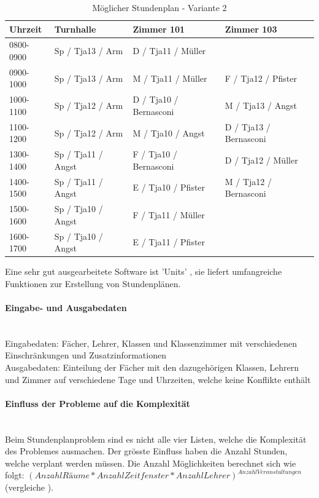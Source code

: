 \begin{table}[ht]
\centering
  \begin{tabular}{ l | l | l | l }
	\hline
	\rowcolor{gray}
	\textbf{Uhrzeit} 	& \textbf{Turnhalle}	& \textbf{Zimmer 101} 	& \textbf{Zimmer 103}	\\ \hline
	0800-0900		& Sp / Tja13 / Arm		& D / Tja11 / Müller		& 				\\ \hline
	0900-1000		& Sp / Tja13 / Arm		& M / Tja11 / Müller		& F / Tja12 / Pfister		\\ \hline
	1000-1100		& Sp / Tja12 / Arm		& D / Tja10 / Bernasconi	& M / Tja13 / Angst		\\ \hline
	1100-1200		& Sp / Tja12 / Arm		& M / Tja10 / Angst		& D / Tja13 / Bernasconi	\\ \hline \hline
	1300-1400		& Sp / Tja11 / Angst	& F / Tja10 / Bernasconi	& D / Tja12 / Müller		\\ \hline
	1400-1500		& Sp / Tja11 / Angst	& E / Tja10 / Pfister		& M / Tja12 / Bernasconi	\\ \hline
	1500-1600		& Sp / Tja10 / Angst	& F / Tja11 / Müller		& 				\\ \hline
	1600-1700		& Sp / Tja10 / Angst	& E / Tja11 / Pfister		& 				\\ \hline
  \end{tabular}
   \caption{Möglicher Stundenplan - Variante 2}\label{table:timetable_2}
\end{table}

\FloatBarrier
	Eine sehr gut ausgearbeitete Software ist 'Units' \cite{unit_express}, sie liefert umfangreiche Funktionen zur Erstellung von Stundenplänen.

	\paragraph{Eingabe- und Ausgabedaten}\mbox{}\\
	Eingabedaten: Fächer, Lehrer, Klassen und Klassenzimmer mit verschiedenen Einschränkungen und Zusatzinformationen\\
	Ausgabedaten: Einteilung der Fächer mit den dazugehörigen Klassen, Lehrern und Zimmer auf verschiedene Tage und Uhrzeiten, welche keine Konflikte enthält

	\paragraph{Einfluss der Probleme auf die Komplexität}\mbox{}\\
	Beim Stundenplanproblem sind es nicht alle vier Listen, welche die Komplexität des Problemes ausmachen. Der grösste Einfluss haben die Anzahl Stunden, welche verplant werden 
	müssen. Die Anzahl Möglichkeiten berechnet sich wie folgt: $(Anzahl Räume * Anzahl Zeitfenster * Anzahl Lehrer)^{Anzahl Veranstaltungen}$ 
	(vergleiche \cite{scheduling_komplex}).

